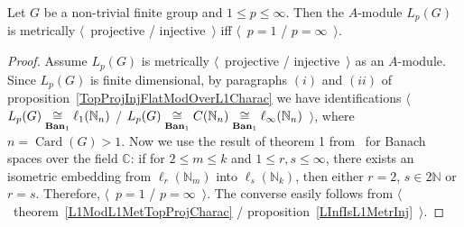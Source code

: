 \begin{proposition}\label{LpFinGrL1MGMetrInjProjCharac} Let $G$ be a non-trivial
finite group and $1\leq p\leq \infty$. Then the $A$-module $L_p(G)$ is
metrically $\langle$~projective / injective~$\rangle$ iff $\langle$~$p=1$ /
$p=\infty$~$\rangle$.
\end{proposition}
\begin{proof} 
Assume $L_p(G)$ is metrically $\langle$~projective / injective~$\rangle$ as an
$A$-module. Since $L_p(G)$ is finite dimensional, by paragraphs $(i)$ and
$(ii)$ of proposition~\ref{TopProjInjFlatModOverL1Charac} we have 
identifications $\langle$~$L_p(G)\mathrel{\mathop{\cong}\limits_{\mathbf{Ban}_1}}\ell_1(\mathbb{N}_n)$ /
$L_p(G)
\mathrel{\mathop{\cong}\limits_{\mathbf{Ban}_1}}
C(\mathbb{N}_n)
\mathrel{\mathop{\cong}\limits_{\mathbf{Ban}_1}}
\ell_\infty(\mathbb{N}_n)$~$\rangle$, 
where $n=\operatorname{Card}(G)>1$. Now we use the result of theorem
1 from~\cite{LyubIsomEmdbFinDimLp} for Banach spaces over the field $\mathbb{C}$: if
for $2\leq m\leq k$ and $1\leq r,s\leq \infty$, there exists an isometric
embedding from $\ell_r(\mathbb{N}_m)$ into $\ell_s(\mathbb{N}_k)$, then either
$r=2$, $s\in 2\mathbb{N}$ or $r=s$. Therefore, $\langle$~$p=1$ /
$p=\infty$~$\rangle$. The converse easily follows from
$\langle$~theorem~\ref{L1ModL1MetTopProjCharac} /
proposition~\ref{LInfIsL1MetrInj}~$\rangle$.
\end{proof}


